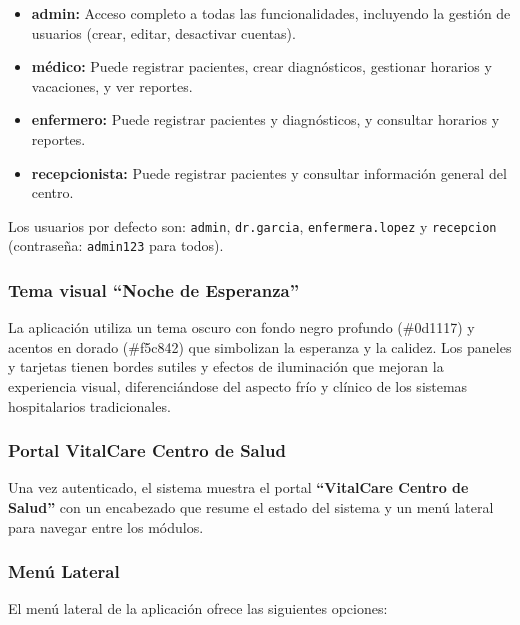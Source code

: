 \documentclass[12pt,a4paper]{article}
\begin{document}
\begin{itemize}
    \item \textbf{admin:} Acceso completo a todas las funcionalidades, incluyendo la gesti\'on de usuarios (crear, editar, desactivar cuentas).
    \item \textbf{m\'edico:} Puede registrar pacientes, crear diagn\'osticos, gestionar horarios y vacaciones, y ver reportes.
    \item \textbf{enfermero:} Puede registrar pacientes y diagn\'osticos, y consultar horarios y reportes.
    \item \textbf{recepcionista:} Puede registrar pacientes y consultar informaci\'on general del centro.
\end{itemize}

Los usuarios por defecto son: \texttt{admin}, \texttt{dr.garcia}, \texttt{enfermera.lopez} y \texttt{recepcion} (contrase\~na: \texttt{admin123} para todos).

\subsubsection{Tema visual ``Noche de Esperanza''}
La aplicaci\'on utiliza un tema oscuro con fondo negro profundo (\#0d1117) y acentos en dorado (\#f5c842) que simbolizan la esperanza y la calidez. Los paneles y tarjetas tienen bordes sutiles y efectos de iluminaci\'on que mejoran la experiencia visual, diferenci\'andose del aspecto fr\'io y cl\'inico de los sistemas hospitalarios tradicionales.

\subsubsection{Portal VitalCare Centro de Salud}
Una vez autenticado, el sistema muestra el portal \textbf{``VitalCare Centro de Salud''} con un encabezado que resume el estado del sistema y un men\'u lateral para navegar entre los m\'odulos.

\subsubsection{Men\'u Lateral}
El men\'u lateral de la aplicaci\'on ofrece las siguientes opciones:
\end{document}
